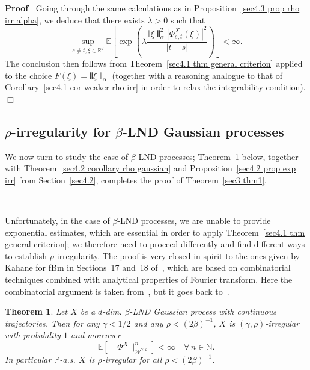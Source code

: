 \documentclass[10pt]{article}
\newenvironment{proof}{\noindent\textbf{Proof\ }}{\hspace*{\fill}$\Box$\medskip}
\newtheorem{theorem}{Theorem}
\begin{document}
\begin{proof}
  Going through the same calculations as in Proposition~\ref{sec4.3 prop rho
  irr alpha}, we deduce that there exists $\lambda > 0$ such that
  \[ \sup_{s \neq t, \xi \in \mathbb{R}^d} \mathbb{E} \left[ \exp \left(
     \lambda \frac{\interleave \xi \interleave_{\alpha}^2  | \Phi^X_{s, t}
     (\xi) |^2}{| t - s |} \right) \right] < \infty . \]
  The conclusion then follows from Theorem~\ref{sec4.1 thm general criterion}
  applied to the choice $F (\xi) = \interleave \xi \interleave_{\alpha}$
  (together with a reasoning analogue to that of Corollary~\ref{sec4.1 cor
  weaker rho irr} in order to relax the integrability condition).
\end{proof}

\subsection{$\rho$\mbox{-}irregularity for $\beta$\mbox{-}LND Gaussian
processes}\label{sec4.4}

We now turn to study the case of $\beta$\mbox{-}LND processes;
Theorem~\ref{sec4.4 main thm} below, together with Theorem~\ref{sec4.2
corollary rho gaussian} and Proposition~\ref{sec4.2 prop exp irr} from
Section~\ref{sec4.2}, completes the proof of Theorem~\ref{sec3 thm1}.

\

Unfortunately, in the case of $\beta$-LND processes, we are unable to provide
exponential estimates, which are essential in order to apply
Theorem~\ref{sec4.1 thm general criterion}; we therefore need to proceed
differently and find different ways to establish $\rho$\mbox{-}irregularity.
The proof is very closed in spirit to the ones given by Kahane for fBm in
Sections~17 and~18 of~{\cite{kahane}}, which are based on combinatorial
techniques combined with analytical properties of Fourier transform. Here the
combinatorial argument is taken from~{\cite{catelliergubinellipreliminary}},
but it goes back to~{\cite{nualart2003}}.

\begin{theorem}
  \label{sec4.4 main thm}Let $X$ be a $d$\mbox{-}dim. $\beta$\mbox{-}LND
  Gaussian process with continuous trajectories. Then for any $\gamma < 1 / 2$
  and any $\rho < (2 \beta)^{- 1}$, $X$ is $(\gamma, \rho)$\mbox{-}irregular
  with probability $1$ and moreover
  \[ \mathbb{E} [\| \Phi^X \|_{\mathcal{W}^{\gamma, \rho}}^n] < \infty \quad
     \forall \, n \in \mathbb{N}. \]
  In particular $\mathbb{P}$\mbox{-}a.s. $X$ is $\rho$\mbox{-}irregular for
  all $\rho < (2 \beta)^{- 1}$.
\end{theorem}
\end{document}
